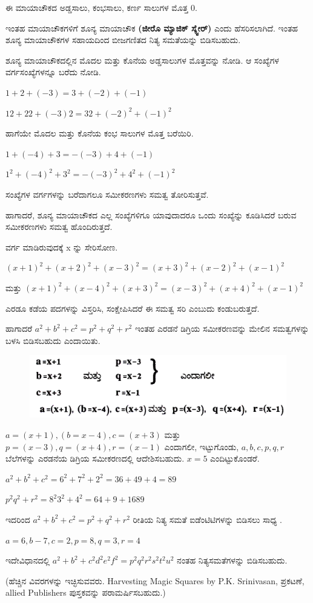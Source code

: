 ಈ ಮಾಯಾಚೌಕದ ಅಡ್ಡಸಾಲು, ಕಂಭಸಾಲು, ಕರ್ಣ ಸಾಲುಗಳ ಮೊತ್ತ 0.

ಇಂತಹ ಮಾಯಾಚೌಕಗಳಿಗೆ ಶೂನ್ಯ ಮಾಯಾಚೌಕ \textbf{(ಜೀರೊ ಮ್ಯಾಜಿಕ್ ಸ್ಕ್ವೇರ್)} ಎಂದು ಹೆಸರಿಸಲಾಗಿದೆ. ಇಂತಹ ಶೂನ್ಯ ಮಾಯಾಚೌಕಗಳ ಸಹಾಯದಿಂದ ಬೀಜಗಣಿತದ ನಿತ್ಯ ಸಮತೆಯನ್ನು ಬಿಡಿಸಬಹುದು.

ಶೂನ್ಯ ಮಾಯಾಚೌಕದಲ್ಲಿನ ಮೊದಲ ಮತ್ತು ಕೊನೆಯ ಅಡ್ಡಸಾಲುಗಳ ಮೊತ್ತವನ್ನು ನೋಡಿ. ಆ ಸಂಖ್ಯೆಗಳ ವರ್ಗಸಂಖ್ಯೆಗಳನ್ನೂ ಬರೆದು ನೋಡಿ.

$1+2+(-3) =3+(-2)+(-1)$

$12+22+(-3) 2 =32+(-2)^2 +(-1)^2$

ಹಾಗೆಯೇ ಮೊದಲ ಮತ್ತು ಕೊನೆಯ ಕಂಭ ಸಾಲುಗಳ ಮೊತ್ತ ಬರೆಯಿರಿ.

$1+(-4)+3 = -(-3)+4+(-1)$

$1^2+(-4)^2 +3^2 =-(-3)^2+4^2 +(-1)^2$

ಸಂಖ್ಯೆಗಳ ವರ್ಗಗಳನ್ನು ಬರೆದಾಗಲೂ ಸಮೀಕರಣಗಳು ಸಮತ್ವ ತೋರಿಸುತ್ತವೆ.

ಹಾಗಾದರೆ, ಶೂನ್ಯ ಮಾಯಾಚೌಕದ ಎಲ್ಲ ಸಂಖ್ಯೆಗಳಿಗೂ ಯಾವುದಾದರೂ ಒಂದು ಸಂಖ್ಯೆನ್ನು ಕೂಡಿಸಿದರೆ ಬರುವ ಸಮೀಕರಣಗಳು ಸಮತ್ವ ಹೊಂದಿರುತ್ತದೆ.

ವರ್ಗ ಮಾಡಿರುವುದಕ್ಕೆ x ನ್ನು ಸೇರಿಸೋಣ.

$(x+1)^2+(x+2)^2+(x-3)^2 = (x+3)^2+(x-2)^2+(x-1)^2$

ಮತ್ತು $(x+1)^2+(x-4)^2+(x+3)^2 = (x-3)^2+(x+4)^2+(x-1)^2$

ಎರಡೂ ಕಡೆಯ ಪದಗಳನ್ನು ವಿಸ್ತರಿಸಿ, ಸಂಕ್ಷೇಪಿಸಿದರೆ ಈ ಸಮತ್ವ ಸರಿ ಎಂಬುದು ಕಂಡುಬರುತ್ತದೆ.

ಹಾಗಾದರೆ $a^2+b^2+c^2 = p^2+q^2+r^2$ ಇಂತಹ ಎರಡನೆ ಡಿಗ್ರಿಯ ಸಮೀಕರಣವನ್ನು ಮೇಲಿನ ಸಮತ್ವಗಳನ್ನು ಬಳಸಿ ಬಿಡಿಸಬಹುದು ಎಂದಾಯಿತು.
\begin{figure}[H]
\includegraphics{src/figures/chap10/fig10-3.jpg}
\end{figure}

$a=(x+1), (b=x-4), c=(x+3)$ ಮತ್ತು $p=(x-3), q=(x+4), r=(x-1)$ ಎಂದಾಗಲೀ, ಇಟ್ಟುಗೊಂಡು, $a, b, c, p, q, r$ ಬೆಲೆಗಳನ್ನು ಎರಡನೆಯ ಡಿಗ್ರಿಯ ಸಮೀಕರಣದಲ್ಲಿ ಆದೇಶಿಸಬಹುದು. $x=5$ ಎಂದಿಟ್ಟುಕೊಂಡರೆ.

$a^2 +b^2+c^2= 6^2 + 7^2 + 2^2 = 36 +49 +4=89$

$p^2 q^2 + r^2 = 8^2 3^2 +4^2 = 64 +9 + 16 89$

ಇದರಿಂದ $a^2+b^2+c^2 = p^2+q^2+r^2$ ರೀತಿಯ ನಿತ್ಯ ಸಮತೆ ಐಡೆಂಟಿಟಿಗಳನ್ನು ಬಿಡಿಸಲು ಸಾಧ್ಯ .

$a=6, b-7, c=2, p=8, q=3, r=4$

ಇದೇವಿಧಾನದಲ್ಲಿ $a^2 +b^2 +c^2 d^2 e^2 f^2 = p^2 q^2 r^2 s^2 t^2 u^2$ ನಂತಹ ನಿತ್ಯಸಮತೆಗಳನ್ನು ಬಿಡಿಸಬಹುದು.

(ಹೆಚ್ಚಿನ ವಿವರಗಳನ್ನು ಇಚ್ಛಿಸುವವರು. Harvesting Magic Squares by P.K. Srinivasan, ಪ್ರಕಟಣೆ, allied Publishers ಪುಸ್ತಕವನ್ನು ಪರಾಮರ್ಷಿಸಬಹುದು.)
